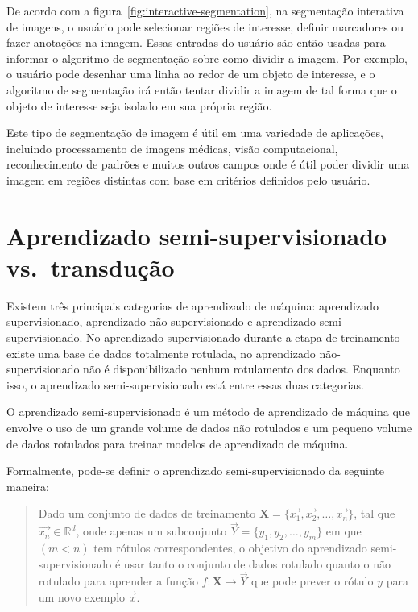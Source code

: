 De acordo com a figura~\ref{fig:interactive-segmentation}, na
segmentação interativa de imagens, o usuário pode selecionar regiões
de interesse, definir marcadores ou fazer anotações na imagem. Essas
entradas do usuário são então usadas para informar o algoritmo de
segmentação sobre como dividir a imagem. Por exemplo, o usuário pode
desenhar uma linha ao redor de um objeto de interesse, e o algoritmo
de segmentação irá então tentar dividir a imagem de tal forma que o
objeto de interesse seja isolado em sua própria região.

Este tipo de segmentação de imagem é útil em uma variedade de
aplicações, incluindo processamento de imagens médicas, visão
computacional, reconhecimento de padrões e muitos outros campos onde é
útil poder dividir uma imagem em regiões distintas com base em
critérios definidos pelo usuário.

\section{Aprendizado semi-supervisionado vs.\ transdução}\label{sec:teorica-aprendizado-semi-supervisionado}

Existem três principais categorias de aprendizado de máquina:
aprendizado supervisionado, aprendizado não-supervisionado e
aprendizado semi-supervisionado. No aprendizado supervisionado durante
a etapa de treinamento existe uma base de dados totalmente rotulada,
no aprendizado não-supervisionado não é disponibilizado nenhum
rotulamento dos dados. Enquanto isso, o aprendizado
semi-supervisionado está entre essas duas categorias.

O aprendizado semi-supervisionado é um método de aprendizado de máquina
que envolve o uso de um grande volume de dados não rotulados e um
pequeno volume de dados rotulados para treinar modelos de aprendizado
de máquina.

Formalmente, pode-se definir o aprendizado semi-supervisionado da seguinte maneira:

\begin{quote}
  Dado um conjunto de dados de treinamento
  $ \mathbf{X} = \{\vec{x_1}, \vec{x_2}, \ldots, \vec{x_n}\} $, tal que $ \vec{x_n} \in \mathbb{R}^d $,
  onde apenas um subconjunto  $ \vec{Y} = \{y_1, y_2, \ldots , y_m\} $ em que $ (m < n) $ tem rótulos
  correspondentes, o objetivo do aprendizado semi-supervisionado é usar
  tanto o conjunto de dados rotulado quanto o não rotulado para aprender
  a função $ f: \mathbf{X} \rightarrow \vec{Y} $ que pode prever o rótulo $ y $ para um novo
  exemplo $ \vec{x} $.
\end{quote}

